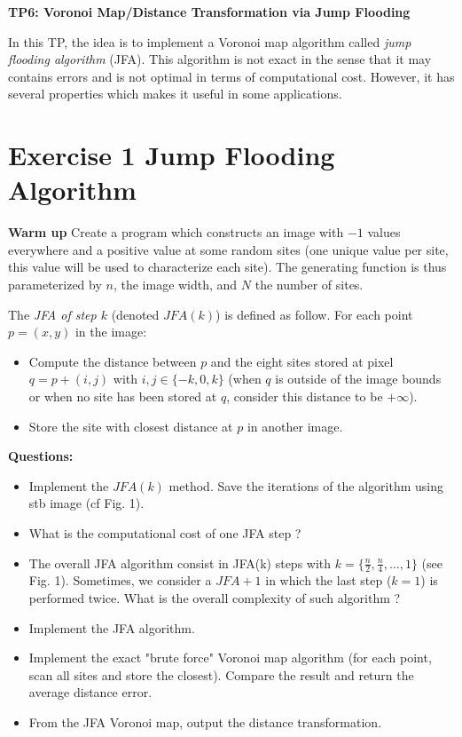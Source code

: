 \documentclass[a4paper, 11pt]{article}
\title{}
\author{}
\date{}
\begin{document}
\begin{center}
	\LARGE \textbf{TP6: Voronoi Map/Distance Transformation via Jump Flooding}
\end{center}

\bigskip
\par In this TP, the idea is to implement a Voronoi map algorithm called \emph{jump flooding algorithm} (JFA). This algorithm is not exact in the sense that it may contains errors and is not optimal in terms of computational cost. However, it has several properties which makes it useful in some applications.



\section*{Exercise 1 \rm Jump Flooding Algorithm}

{\bf Warm up} Create a program which constructs an image with $-1$  values everywhere and a positive  value at some random sites (one unique value per site, this value will be used to characterize each site). The generating function is thus parameterized by $n$, the image width, and $N$ the number of sites. 


\par The \emph{JFA of step $k$} (denoted $JFA(k)$) is defined as follow. For each point $p=(x,y)$ in the image:
	\begin{itemize}
	\item Compute the distance between $p$ and the eight sites stored at pixel $q = p + (i,j)$ with $i,j \in \{-k, 0, k\}$ (when $q$ is outside of the image bounds or when no site has been stored at $q$, consider this distance to be $+\infty$).
	\item Store the site with closest distance at $p$ in another image.
	\end{itemize}


\bigskip
{\bf Questions:}
\begin{itemize}
	\item Implement the $JFA(k)$ method. Save the iterations of the algorithm using stb image (cf Fig. 1).
	\item What is the computational cost of one JFA step ?
	\item The overall JFA algorithm consist in JFA(k) steps with $k=\{\frac{n}{2}, \frac{n}{4}, \ldots, 1\}$ (see Fig. 1). Sometimes, we consider a $JFA+1$ in which the last step ($k=1$) is performed twice. What is the overall complexity of such algorithm ?
	\item Implement the JFA algorithm.
	\item Implement the exact "brute force" Voronoi map algorithm (for each point, scan all sites and store the closest). Compare the result and return the average distance error.
	\item From the JFA Voronoi map, output the distance transformation.
\end{itemize}
\end{document}
